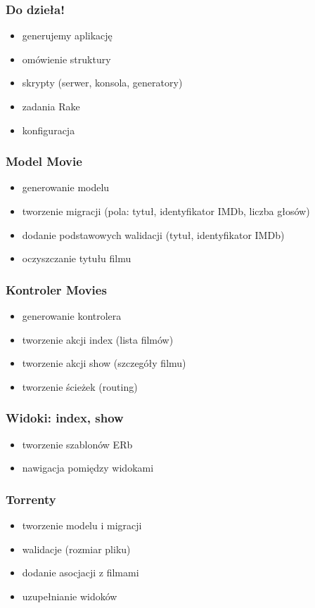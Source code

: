 \documentclass[12t]{beamer}
\begin{document}
\begin{frame}
  \frametitle{Do dzieła!}
  \begin{itemize}
  \item generujemy aplikację
  \item omówienie struktury
  \item skrypty (serwer, konsola, generatory)
  \item zadania Rake
  \item konfiguracja
  \end{itemize}
\end{frame}

\begin{frame}
  \frametitle{Model Movie}
  \begin{itemize}
  \item generowanie modelu
  \item tworzenie migracji (pola: tytuł, identyfikator IMDb, liczba
    głosów)
  \item dodanie podstawowych walidacji (tytuł, identyfikator IMDb)
  \item oczyszczanie tytułu filmu
  \end{itemize}
\end{frame}

\begin{frame}
  \frametitle{Kontroler Movies}
  \begin{itemize}
  \item generowanie kontrolera
  \item tworzenie akcji index (lista filmów)
  \item tworzenie akcji show (szczegóły filmu)
  \item tworzenie ścieżek (routing)
  \end{itemize}
\end{frame}

\begin{frame}
  \frametitle{Widoki: index, show}
  \begin{itemize}
  \item tworzenie szablonów ERb
  \item nawigacja pomiędzy widokami
  \end{itemize}
\end{frame}

\begin{frame}
  \frametitle{Torrenty}
  \begin{itemize}
  \item tworzenie modelu i migracji
  \item walidacje (rozmiar pliku)
  \item dodanie asocjacji z filmami
  \item uzupełnianie widoków
  \end{itemize}
\end{frame}
\end{document}
